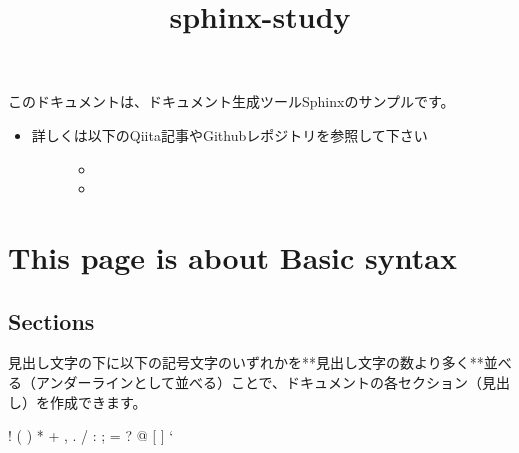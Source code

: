 \documentclass[letterpaper,10pt,dvipdfmx,openany,oneside]{sphinxmanual}
\title{sphinx-study}
\date{ }
\author{}
\begin{document}
\maketitle
\sphinxtableofcontents
{}\label{\detokenize{index::doc}}


このドキュメントは、ドキュメント生成ツールSphinxのサンプルです。
\begin{itemize}
\item {} \begin{description}
\item[{詳しくは以下のQiita記事やGithubレポジトリを参照して下さい}] \leavevmode\begin{itemize}
\item {} 

\item {} 

\end{itemize}

\end{description}

\end{itemize}


\chapter{This page is about Basic syntax}
\label{\detokenize{1.chapter/basic_syntax:this-page-is-about-basic-syntax}}\label{\detokenize{1.chapter/basic_syntax:sphinx-sample-project}}\label{\detokenize{1.chapter/basic_syntax::doc}}

\section{Sections}
\label{\detokenize{1.chapter/basic_syntax:sections}}
見出し文字の下に以下の記号文字のいずれかを**見出し文字の数より多く**並べる（アンダーラインとして並べる）ことで、ドキュメントの各セクション（見出し）を作成できます。

%
\begin{sphinxVerbatim}[commandchars=\\\{\}]
! \PYGZdq{} \PYGZsh{} \PYGZdl{} \PYGZpc{} \PYGZam{} \PYGZsq{} ( ) * + , \PYGZhy{} . / : ; \PYGZlt{} = \PYGZgt{} ? @ [ \PYGZbs{} ] \PYGZca{} \PYGZus{} {}` \PYGZob{} \textbar{} \PYGZcb{} \PYGZti{}
\end{sphinxVerbatim}
\end{document}
